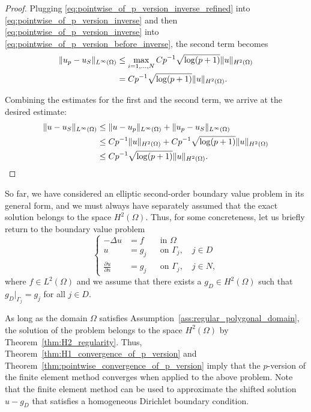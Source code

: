 \documentclass[english, 12pt, a4paper, sci, utf8, a-2b, online]{aaltothesis}
\theoremstyle{definition}
\theoremstyle{plain}
\DeclarePairedDelimiter\norm{\lVert}{\rVert}
\numberwithin{equation}{section}
\begin{document}
\begin{proof}
    Plugging \eqref{eq:pointwise_of_p_version_inverse_refined} into
    \eqref{eq:pointwise_of_p_version_inverse} and then
    \eqref{eq:pointwise_of_p_version_inverse} into
    \eqref{eq:pointwise_of_p_version_before_inverse}, the second term becomes
    \begin{align*}
        \norm{u_p-u_S}_{L^{\infty}(\Omega)}
        &\leq \max_{i=1,\dotsc,N} C p^{-1} \sqrt{\log(p+1)} \norm{u}_{H^2(\Omega)} 
            \\
        &=  C p^{-1} \sqrt{\log(p+1)} \norm{u}_{H^2(\Omega)}.
    \end{align*}

    Combining the estimates for the first and the second term,
    we arrive at the desired estimate:
    \begin{align*}
        \norm{u-u_S}_{L^{\infty}(\Omega)}
        &\leq \norm{u-u_p}_{L^{\infty}(\Omega)}
            + \norm{u_p-u_S}_{L^{\infty}(\Omega)} \\
        &\leq C p^{-1} \norm{u}_{H^2(\Omega)}
            + C p^{-1} \sqrt{\log(p+1)} \norm{u}_{H^2(\Omega)} \\
        &\leq C p^{-1} \sqrt{\log(p+1)} \norm{u}_{H^2(\Omega)}.
    \end{align*}
\end{proof}

So far, we have considered an elliptic second-order boundary value
problem in its general form, and we must always have separately assumed that
the exact solution belongs to the space $H^2(\Omega)$.
Thus, for some concreteness,
let us briefly return to the boundary value problem
\begin{equation*}
    \left\{
        \begin{aligned}
            -\Delta u &= f && \text{in } \Omega \\
            u &= g_j && \text{on } \Gamma_j, \quad j \in D \\
            \frac{\partial u}{\partial n} &= g_j && \text{on } \Gamma_j,
            \quad j \in N,
        \end{aligned}
    \right.
\end{equation*}
where $f \in L^2(\Omega)$ and we assume that there exists
a $g_D \in H^2(\Omega)$ such that $g_D|_{\Gamma_j} = g_j$ for all $j \in D$.

As long as the domain $\Omega$ satisfies 
Assumption~\ref{ass:regular_polygonal_domain}, the solution
of the problem belongs to the space $H^2(\Omega)$
by Theorem~\ref{thm:H2_regularity}.
Thus, Theorem~\ref{thm:H1_convergence_of_p_version}
and Theorem~\ref{thm:pointwise_convergence_of_p_version}
imply that the $p$-version of the finite element method converges
when applied to the above problem.
Note that the finite element method can be used to approximate
the shifted solution $u - g_D$ that satisfies a homogeneous
Dirichlet boundary condition.
\end{document}
